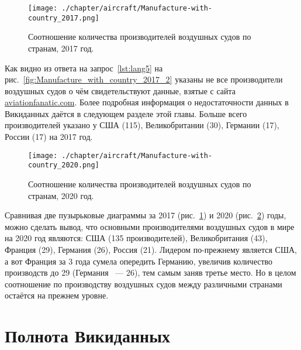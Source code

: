 \begin{figure}[h!]
\centering
	\texttt{[image: ./chapter/aircraft/Manufacture-with-country\_2017.png]}
	\caption{Соотношение количества производителей воздушных судов по странам, 2017 год.}
	\label{fig:Manufacture_with_country_2017}
\end{figure}

\label{aircraft_question_4}

Как видно из ответа на запрос~\ref{lst:lang5} на рис.~\ref{fig:Manufacture_with_country_2017_2} указаны не все производители воздушных судов о чём свидетельствуют данные, взятые с сайта \href{https://www.aviationfanatic.com/}{aviationfanatic.com}. Более подробная информация о недостаточности данных в Викиданных даётся в следующем разделе этой главы. Больше всего производителей указано у США (115), Великобритании (30), Германии (17), России (17) на 2017 год.

\begin{figure}[h!]
\centering
	\texttt{[image: ./chapter/aircraft/Manufacture-with-country\_2020.png]}
	\caption{Соотношение количества производителей воздушных судов по странам, 2020 год.}
	\label{fig:Manufacture_with_country_2020}
\end{figure}

\label{fig:Manufacture_with_country_2017_2}

Сравнивая две пузырьковые диаграммы за 2017 (рис.~\ref{fig:Manufacture_with_country_2017}) и 2020 (рис.~\ref{fig:Manufacture_with_country_2020}) годы, можно сделать вывод, что основными производителями воздушных судов в мире на 2020 год являются: США (135 производителей), Великобритания (43), Франция (29), Германия (26), Россия (21). Лидером по-прежнему является США, а вот Франция за 3 года сумела опередить Германию, увеличив количество производств до 29 (Германия ~--- 26), тем самым заняв третье место. Но в целом соотношение по производству воздушных судов между различными странами остаётся на прежнем уровне.

\section{Полнота Викиданных}

